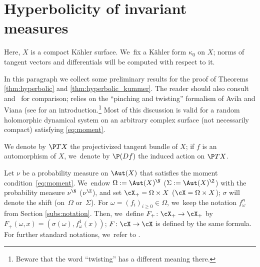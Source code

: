 \section{Hyperbolicity of invariant measures}\label{sec:hyperbolicity}

Here, $X$ is a compact Kähler surface. We~fix a Kähler form $\kappa_0$ on $X$; norms of tangent vectors and differentials will be computed with respect to it.

\label{subs:ledrappier_invariance_principle}
In this paragraph we collect some preliminary results for the proof of Theorems \ref{thm:hyperbolic} and \ref{thm:hyperbolic_kummer}.
The reader should also consult~\cite{barrientos-malicet} and~\cite{obata-poletti} for comparison;
\cite{obata-poletti} relies on the ``pinching and twisting'' formalism of Avila and Viana
(see \cite{viana} for an introduction.\footnote{Beware that the word ``twisting'' has a different meaning there.}
Most of this discussion is valid for a random holomorphic dynamical system on an arbitrary complex surface (not necessarily compact)
satisfying \eqref{eq:moment}.

We denote by $ \P TX$ the projectivized tangent bundle of $X$; if $f$ is an automorphism of $X$, we~denote by $\P(Df)$ the induced action on $\P TX$.

Let $\nu$ be a probability measure on $\Aut(X)$ that satisfies the moment condition~\eqref{eq:moment}. We~endow $\Omega:=\Aut(X)^\N$ (\resp $\Sigma:= \Aut(X)^\Z$)
with the probability measure $\nu^\N$ (\resp $\nu^\Z$), and set $\cX_+=\Omega \times X$ (\resp $\cX=\Omega \times X$); $\sigma$ will denote the shift (on~$\Omega$ or~$\Sigma$).
For $\omega=(f_i)_{i\geq 0}\in \Omega$, we~keep the notation $f_\omega^{n}$ from
Section \ref{subs:notation}. Then, we~define $F_+\colon \cX_+\to \cX_+$ by
$F_+(\omega,x)=(\sigma(\omega), f^1_\omega(x))$; $F\colon \cX\to \cX$ is defined by the same formula. For further standard notations, we~refer to \cite[\S 7]{stiffness}.

